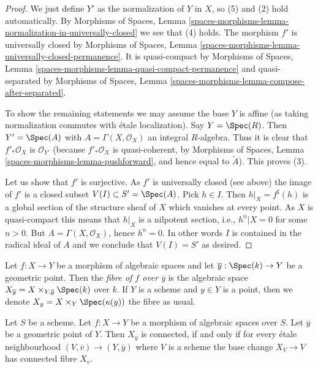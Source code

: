 \begin{proof}
We just define $Y'$ as the normalization of $Y$ in $X$, so (5) and (2) hold
automatically. By
Morphisms of Spaces, Lemma
\ref{spaces-morphisms-lemma-normalization-in-universally-closed}
we see that (4) holds. The morphism $f'$ is universally closed by
Morphisms of Spaces, Lemma
\ref{spaces-morphisms-lemma-universally-closed-permanence}.
It is quasi-compact by
Morphisms of Spaces, Lemma
\ref{spaces-morphisms-lemma-quasi-compact-permanence}
and quasi-separated by
Morphisms of Spaces, Lemma
\ref{spaces-morphisms-lemma-compose-after-separated}.

\medskip\noindent
To show the remaining statements we may assume the base $Y$ is affine
(as taking normalization commutes with \'etale localization).
Say $Y = \Spec(R)$. Then $Y' = \Spec(A)$ with
$A = \Gamma(X, \mathcal{O}_X)$ an integral $R$-algebra.
Thus it is clear that $f'_*\mathcal{O}_X$
is $\mathcal{O}_{Y'}$ (because $f'_*\mathcal{O}_X$ is quasi-coherent,
by Morphisms of Spaces, Lemma
\ref{spaces-morphisms-lemma-pushforward},
and hence equal to $\widetilde{A}$). This proves (3).

\medskip\noindent
Let us show that $f'$ is surjective. As $f'$ is universally closed (see above)
the image of $f'$ is a closed subset
$V(I) \subset S' = \Spec(A)$. Pick $h \in I$. Then
$h|_X = f^\sharp(h)$ is a global section of the structure sheaf of
$X$ which vanishes at every point. As $X$ is quasi-compact this means
that $h|_X$ is a nilpotent section, i.e., $h^n|X = 0$ for some $n > 0$.
But $A = \Gamma(X, \mathcal{O}_X)$, hence $h^n = 0$.
In other words $I$ is contained in the radical ideal of $A$ and we conclude
that $V(I) = S'$ as desired.
\end{proof}

\noindent
Let $f : X \to Y$ be a morphism of algebraic spaces and let
$\overline{y} : \Spec(k) \to Y$ be a geometric point. Then the
{\it fibre of $f$ over $\overline{y}$} is the algebraic space
$X_{\overline{y}} = X \times_{Y, \overline{y}} \Spec(k)$ over $k$.
If $Y$ is a scheme and $y \in Y$ is a point, then we denote
$X_y = X \times_Y \Spec(\kappa(y))$ the fibre as usual.

\begin{lemma}
\label{lemma-characterize-geometrically-connected-fibres}
Let $S$ be a scheme. Let $f : X \to Y$ be a morphism of algebraic spaces
over $S$. Let $\overline{y}$ be a geometric point of $Y$. Then
$X_{\overline{y}}$ is connected, if and only if for every \'etale
neighbourhood $(V, \overline{v}) \to (Y, \overline{y})$ where $V$
is a scheme the base change $X_V \to V$ has connected fibre $X_v$.
\end{lemma}

